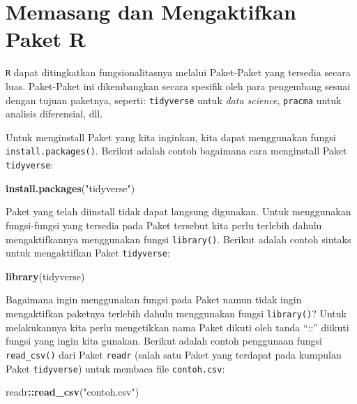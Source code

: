 \documentclass[
]{book}
\newenvironment{Shaded}{\begin{snugshade}}{\end{snugshade}}
\newcommand{\FunctionTok}[1]{\textcolor[rgb]{0.13,0.29,0.53}{\textbf{#1}}}
\newcommand{\NormalTok}[1]{#1}
\newcommand{\SpecialCharTok}[1]{\textcolor[rgb]{0.81,0.36,0.00}{\textbf{#1}}}
\newcommand{\StringTok}[1]{\textcolor[rgb]{0.31,0.60,0.02}{#1}}
\theoremstyle{definition}
\theoremstyle{definition}
\theoremstyle{definition}
\theoremstyle{definition}
\theoremstyle{remark}
\begin{document}
\hypertarget{installlibraryR}{%
\section{Memasang dan Mengaktifkan Paket R}\label{installlibraryR}}

\texttt{R} dapat ditingkatkan fungsionalitasnya melalui Paket-Paket yang tersedia secara luas. Paket-Paket ini dikembangkan secara spesifik oleh para pengembang sesuai dengan tujuan paketnya, seperti: \texttt{tidyverse} untuk \emph{data science}, \texttt{pracma} untuk analisis diferensial, dll.

Untuk menginstall Paket yang kita inginkan, kita dapat menggunakan fungsi \texttt{install.packages()}. Berikut adalah contoh bagaimana cara menginstall Paket \texttt{tidyverse}:

\begin{Shaded}
\begin{Highlighting}[]
\FunctionTok{install.packages}\NormalTok{(}\StringTok{"tidyverse"}\NormalTok{)}
\end{Highlighting}
\end{Shaded}

Paket yang telah diinstall tidak dapat langsung digunakan. Untuk menggunakan fungsi-fungsi yang tersedia pada Paket tersebut kita perlu terlebih dahulu mengaktifkannya menggunakan fungsi \texttt{library()}. Berikut adalah contoh sintaks untuk mengaktifkan Paket \texttt{tidyverse}:

\begin{Shaded}
\begin{Highlighting}[]
\FunctionTok{library}\NormalTok{(tidyverse)}
\end{Highlighting}
\end{Shaded}

Bagaimana ingin menggunakan fungsi pada Paket namun tidak ingin mengaktifkan paketnya terlebih dahulu menggunakan fungsi \texttt{library()}? Untuk melakukannya kita perlu mengetikkan nama Paket dikuti oleh tanda ``::'' diikuti fungsi yang ingin kita gunakan. Berikut adalah contoh penggunaan fungsi \texttt{read\_csv()} dari Paket \texttt{readr} (salah satu Paket yang terdapat pada kumpulan Paket \texttt{tidyverse}) untuk membaca file \texttt{contoh.csv}:

\begin{Shaded}
\begin{Highlighting}[]
\NormalTok{readr}\SpecialCharTok{::}\FunctionTok{read\_csv}\NormalTok{(}\StringTok{"contoh.csv"}\NormalTok{)}
\end{Highlighting}
\end{Shaded}
\end{document}
